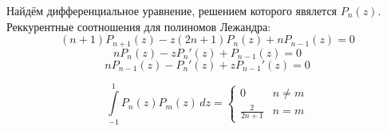 
\setcounter{equation}{0}
Найдём дифференциальное уравнение, решением которого явялется $P_n(z).$
Реккурентные соотношения для полиномов Лежандра:
\begin{equation}
	(n + 1) P_{n + 1} (z) - z (2n + 1) P_n(z) + n P_{n - 1} (z) = 0
	\label{equ:AttachedLajandr2}
\end{equation}
\begin{equation}
	n P_n (z) - z P_n'(z) + P_{n - 1}(z) = 0
	\label{equ:AttachedLajandr3}
\end{equation}
\begin{equation}
	n P_{n - 1}(z) - P_n'(z) + z P_{n - 1}' (z) = 0
	\label{equ:AttachedLajandr4}
\end{equation}

\[
    \int\limits_{-1}^1 P_n(z) P_m (z) \, dz = 
	\begin{cases} 
		0 & n \neq m \\ 
		\frac{2}{2n + 1} & n = m 
	\end{cases}
\]

